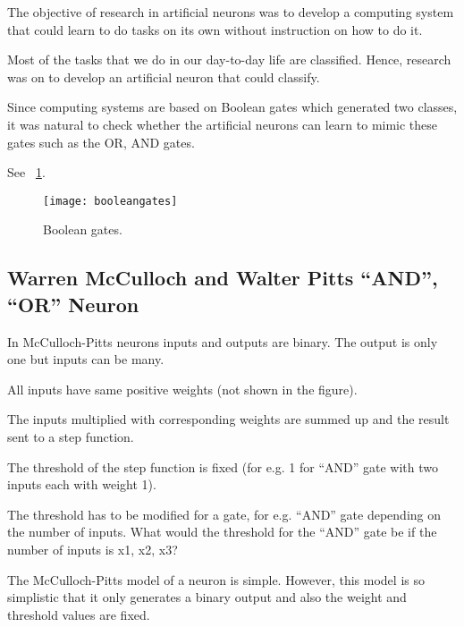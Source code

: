 	\begin{bulletedlist}
		\item The objective of research in artificial neurons was to develop a computing system that could learn to do tasks on its own without instruction on how to do it.
		\item Most of the tasks that we do in our day-to-day life are classified. Hence, research was on to develop an artificial neuron that could classify.
		\item Since computing systems are based on Boolean gates which generated two classes, it was natural to check whether the artificial neurons can learn to mimic these gates such as the OR, AND gates.
	\end{bulletedlist}
See \figurename~\ref{fig:booleangates}.
 	\begin{figure}[htb]
		\centering
		\texttt{[image: booleangates]}
		\caption[Boolean gates]{Boolean gates.}
		\label{fig:booleangates}
	\end{figure}

	\subsection{Warren McCulloch and Walter Pitts ``AND'', ``OR'' Neuron}

	\begin{bulletedlist}
		\item In McCulloch-Pitts neurons inputs and outputs are binary. The output is only one but inputs can be many.
		\item All inputs have same positive weights (not shown in the figure).
		\item The inputs multiplied with corresponding weights are summed up and the result sent to a step function.
		\item The threshold of the step function is fixed (for e.g. 1 for ``AND'' gate with two inputs each with weight 1).
		\item The threshold has to be modified for a gate, for e.g. ``AND'' gate depending on the number of inputs.  What would the threshold for the ``AND'' gate be if the number of inputs is x1, x2, x3?
		\item The McCulloch-Pitts model of a neuron is simple. However, this model is so simplistic that it only generates a binary output and also the weight and threshold values are
fixed.
	\end{bulletedlist}



